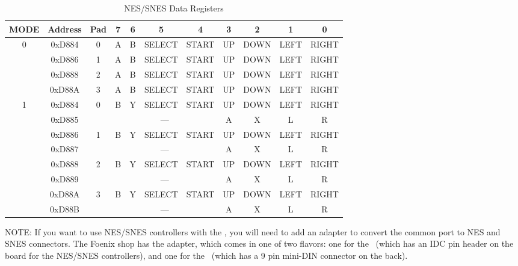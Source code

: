 \begin{table}[ht]
    \begin{center}
        \begin{tabular}{|c|c|c|c|c|c|c|c|c|c|c|} \hline
            MODE & Address & Pad & 7 & 6 & 5 & 4 & 3 & 2 & 1 & 0 \\\hline\hline
            \multirow{4}{*}{0} & 0xD884 & 0 & A & B & SELECT & START & UP & DOWN & LEFT & RIGHT \\\cline{2-11}
                & 0xD886 & 1 & A & B & SELECT & START & UP & DOWN & LEFT & RIGHT \\\cline{2-11}
                & 0xD888 & 2 & A & B & SELECT & START & UP & DOWN & LEFT & RIGHT \\\cline{2-11}
                & 0xD88A & 3 & A & B & SELECT & START & UP & DOWN & LEFT & RIGHT \\\hline\hline

            \multirow{8}{*}{1} & 0xD884 & \multirow{2}{*}{0} & B & Y & SELECT & START & UP & DOWN & LEFT & RIGHT \\\cline{2-2}\cline{4-11}
                               & 0xD885 &                    & \multicolumn{4}{|c|}{---} & A & X & L & R \\\cline{2-11}
                               & 0xD886 & \multirow{2}{*}{1} & B & Y & SELECT & START & UP & DOWN & LEFT & RIGHT \\\cline{2-2}\cline{4-11}
                               & 0xD887 &                    & \multicolumn{4}{|c|}{---} & A & X & L & R \\\cline{2-11}
                               & 0xD888 & \multirow{2}{*}{2} & B & Y & SELECT & START & UP & DOWN & LEFT & RIGHT \\\cline{2-2}\cline{4-11}
                               & 0xD889 &                    & \multicolumn{4}{|c|}{---} & A & X & L & R \\\cline{2-11}
                               & 0xD88A & \multirow{2}{*}{3} & B & Y & SELECT & START & UP & DOWN & LEFT & RIGHT \\\cline{2-2}\cline{4-11}
                               & 0xD88B &                    & \multicolumn{4}{|c|}{---} & A & X & L & R \\\hline
        \end{tabular}
    \end{center}
    \caption{NES/SNES Data Registers}
    \label{tab:nes_data_reg}
\end{table}

NOTE: If you want to use NES/SNES controllers with the \jr, you will need to add an adapter to convert the common port to NES and SNES connectors. The Foenix shop has the adapter, which comes in one of two flavors: one for the \jr\ (which has an IDC pin header on the board for the NES/SNES controllers), and one for the \fk\ (which has a 9 pin mini-DIN connector on the back).